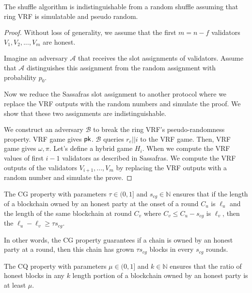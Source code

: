 


\begin{theorem}
	The shuffle algorithm is indistinguishable from a random shuffle assuming that ring VRF is simulatable and pseudo random.
\end{theorem}

\begin{proof}
	Without loss of generality, we assume that the first $ m = n - f$ validators $ V_1, V_2,...,V_m $ are honest. 
	
	Imagine an adversary $ \mathcal{A} $ that receives the slot assignments of validators. Assume that $ \mathcal{A} $ distinguishes this assignment from the random assignment with probability $ p_0 $.
	
	Now we reduce the Sassafras slot assignment to another protocol where we replace the VRF outputs with the random numbers and simulate the proof.
	We show that these two assignments are indistinguishable.
	
	We construct an adversary $ \mathcal{B} $ to break the ring VRF's pseudo-randomness property.  VRF game gives $ \mathsf{pk} $.  $ \mathcal{B} $ queries $ r_e||i $ to the VRF game. Then, VRF game gives $ \omega, \pi $. Let's define a hybrid game $ H_{i} $. When we compute the VRF values of first $ i-1 $ validators as described in Sassafras. We compute the VRF outputs of the validators $ V_{i+1},...,V_m $ by replacing the VRF outputs with a random number and simulate the prove.
\end{proof}


\begin{definition} \label{def:cg}
	The CG  property with parameters $ \tau \in (0,1] $ and $ s_{cg}\in \mathbb{N} $ ensures that if the length of a blockchain owned by an honest party at the onset of a round $ C_u $ is $ \ell_u $ and the length of the same blockchain at round $ C_v  $ where $ C_v \leq C_u - s_{cg}  $ is $\ell_v$, then the $ \ell_u  - \ell_v \geq  \tau s_{cg} $.
\end{definition}

In other words, the CG property guarantees if a chain is owned by an honest party at a round, then this chain has grown $ \tau s_{cg}$ blocks in every $ s_{cg} $ rounds. 

\begin{definition}\label{def:cq}
	The CQ property with parameters $ \mu \in (0,1]  $ and $ k \in \mathbb{N} $ ensures that the ratio of honest blocks in any $ k $ length portion of a blockchain owned by an honest party is at least $ \mu $.
\end{definition} 

